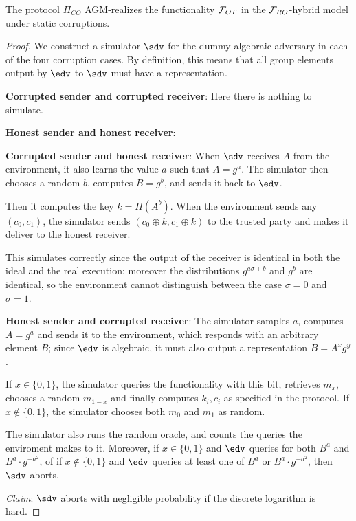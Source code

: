 \begin{theorem}
    The protocol $\Pi_{CO}$ AGM-realizes the functionality $\mathcal{F}_{OT}$ in the $\mathcal{F}_{RO}$-hybrid model under static corruptions.
\end{theorem}
\begin{proof}
    We construct a simulator $\sdv$ for the dummy algebraic adversary in each of the four corruption cases. By definition, this means that all group elements output by $\edv$ to $\sdv$ must have a representation.

    \textbf{Corrupted sender and corrupted receiver}: Here there is nothing to simulate.

    \textbf{Honest sender and honest receiver}:

    \textbf{Corrupted sender and honest receiver}: When $\sdv$ receives $A$ from the environment, it also learns the value $a$ such that $A=g^a$.
    The simulator then chooses a random $b$, computes $B=g^b$, and sends it back to $\edv$.

    Then it computes the key $k=H(A^b)$. When the environment sends any $(c_0,c_1)$, the simulator sends $(c_0\oplus k, c_1\oplus k)$ to the trusted party and makes it deliver to the honest receiver.

    This simulates correctly since the output of the receiver is identical in both the ideal and the real execution; moreover the distributions $g^{a\sigma+b}$ and $g^b$ are identical, so the environment cannot distinguish between the case $\sigma=0$ and $\sigma=1$.

    \textbf{Honest sender and corrupted receiver}: The simulator samples $a$, computes $A=g^a$ and sends it to the environment, which responds with an arbitrary element $B$; since $\edv$ is algebraic, it must also output a representation $B=A^x g^y$.

    If $x\in\{0,1\}$, the simulator queries the functionality with this bit, retrieves $m_x$, chooses a random $m_{1-x}$ and finally computes $k_i,c_i$ as specified in the protocol. If $x\not\in\{0,1\}$, the simulator chooses both $m_0$ and $m_1$ as random.

    The simulator also runs the random oracle, and counts the queries the enviroment makes to it. Moreover, if $x\in\{0,1\}$ and $\edv$ queries for both $B^a$ and $B^a\cdot g^{-a^2}$, of if $x\not\in\{0,1\}$ and $\edv$ queries at least one of $B^a$ or $B^a\cdot g^{-a^2}$, then $\sdv$ aborts.

    \textit{Claim}: $\sdv$ aborts with negligible probability if the discrete logarithm is hard.


\end{proof}
